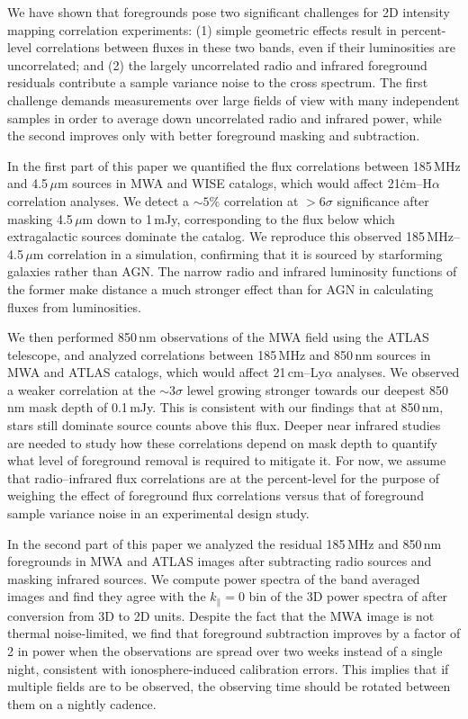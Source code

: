\documentclass[numberedappendix]{emulateapj}
\begin{document}
We have shown that foregrounds pose two significant challenges for 2D intensity mapping correlation experiments: (1) simple geometric effects result in percent-level correlations between fluxes in these two bands, even if their luminosities are uncorrelated; and (2) the largely uncorrelated radio and infrared foreground residuals contribute a sample variance noise to the cross spectrum. The first challenge demands measurements over large fields of view with many independent samples in order to average down uncorrelated radio and infrared power, while the second improves only with better foreground masking and subtraction.

In the first part of this paper we quantified the flux correlations between 185\,MHz and 4.5\,$\mu$m sources in MWA and WISE catalogs, which would affect 21\.cm--H$\alpha$ correlation analyses. We detect a $\sim5\%$ correlation at $>6\sigma$ significance after masking 4.5\,$\mu$m down to 1\,mJy, corresponding to the flux below which extragalactic sources dominate the catalog. We reproduce this observed 185\,MHz--4.5\,$\mu$m correlation in a simulation, confirming that it is sourced by starforming galaxies rather than AGN. The narrow radio and infrared luminosity functions of the former make distance a much stronger effect than for AGN in calculating fluxes from luminosities. 

We then performed 850\,nm observations of the MWA field using the ATLAS telescope, and analyzed correlations between 185\,MHz and 850\,nm sources in MWA and ATLAS catalogs, which would affect 21\,cm--Ly$\alpha$ analyses. We observed a weaker correlation at the $\sim3\sigma$ lewel growing stronger towards our deepest 850\,nm mask depth of 0.1\,mJy. This is consistent with our findings that at 850\,nm, stars still dominate source counts above this flux. Deeper near infrared studies are needed to study how these correlations depend on mask depth to quantify what level of foreground removal is required to mitigate it. For now, we assume that radio--infrared flux correlations are at the percent-level for the purpose of weighing the effect of foreground flux correlations versus that of foreground sample variance noise in an experimental design study.

In the second part of this paper we analyzed the residual 185\,MHz and 850\,nm foregrounds in MWA and ATLAS images after subtracting radio sources and masking infrared sources. We compute power spectra of the band averaged images and find they agree with the $k_\parallel=0$ bin of the 3D power spectra of \citet{beardsley16} after conversion from 3D to 2D units. Despite the fact that the MWA image is not thermal noise-limited, we find that foreground subtraction improves by a factor of 2 in power when the observations are spread over two weeks instead of a single night, consistent with ionosphere-induced calibration errors. This implies that if multiple fields are to be observed, the observing time should be rotated between them on a nightly cadence. 
\end{document}
